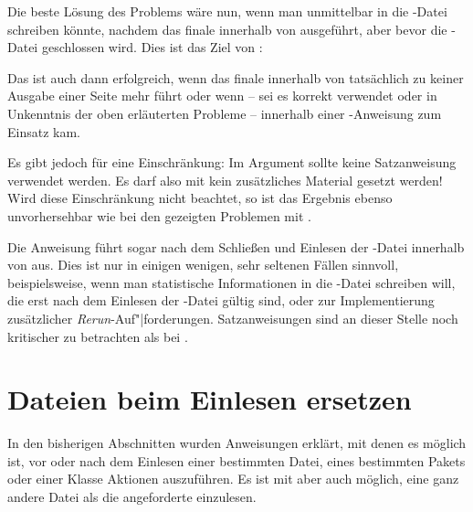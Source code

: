 Die beste Lösung des Problems wäre nun, wenn man unmittelbar in die
-Datei schreiben könnte, nachdem das finale
 innerhalb von 
ausgeführt, aber bevor die -Datei geschlossen wird. Dies ist das
Ziel von :
\begin{lstcode}
  \BeforeClosingMainAux{%
    \if@filesw
      \immediate\write\@auxout{\protect\writethistoaux}%
    \fi
  }
\end{lstcode}
Das ist auch dann erfolgreich, wenn das finale 
innerhalb von  tatsächlich zu keiner Ausgabe
einer Seite mehr führt oder wenn -- sei es korrekt verwendet oder in
Unkenntnis der oben erläuterten Probleme -- 
innerhalb einer -Anweisung zum Einsatz kam.

Es gibt jedoch für  eine Einschränkung: Im
Argument  sollte keine Satzanweisung verwendet
werden. Es darf also mit  kein zusätzliches
Material gesetzt werden! Wird diese Einschränkung nicht beachtet, so ist das
Ergebnis ebenso unvorhersehbar wie bei den gezeigten Problemen mit
.

Die Anweisung 
führt sogar  nach dem Schließen und Einlesen der
-Datei innerhalb von  aus. Dies ist
nur in einigen wenigen, sehr seltenen Fällen sinnvoll, beispielsweise, wenn
man statistische Informationen in die -Datei schreiben will, die
erst nach dem Einlesen der -Datei gültig sind, oder zur
Implementierung zusätzlicher
\mbox{\emph{Rerun}}-\mbox{Auf"|forderungen}. Satzanweisungen sind an dieser
Stelle noch kritischer zu betrachten als bei .%
%
\EndIndexGroup


\section{Dateien beim Einlesen ersetzen}

In den bisherigen Abschnitten wurden Anweisungen erklärt, mit denen es möglich
ist, vor oder nach dem Einlesen einer bestimmten Datei, eines bestimmten
Pakets oder einer Klasse Aktionen auszuführen. Es ist mit 
aber auch möglich, eine ganz andere Datei als die angeforderte einzulesen.

